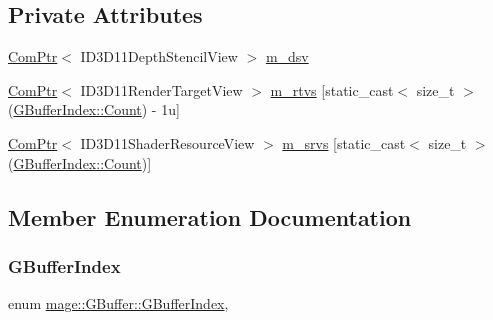 \subsection*{Private Attributes}
\begin{DoxyCompactItemize}
\item 
\hyperlink{namespacemage_ae74f374780900893caa5555d1031fd79}{Com\+Ptr}$<$ I\+D3\+D11\+Depth\+Stencil\+View $>$ \hyperlink{structmage_1_1_g_buffer_a75ef598ba704be52788b7d6c9efe26e7}{m\+\_\+dsv}
\item 
\hyperlink{namespacemage_ae74f374780900893caa5555d1031fd79}{Com\+Ptr}$<$ I\+D3\+D11\+Render\+Target\+View $>$ \hyperlink{structmage_1_1_g_buffer_a323230c320cc2de8ec9e2fb7aea45e92}{m\+\_\+rtvs} \mbox{[}static\+\_\+cast$<$ size\+\_\+t $>$(\hyperlink{structmage_1_1_g_buffer_a72f0fc0f46052fdc9872c48c57894607ae93f994f01c537c4e2f7d8528c3eb5e9}{G\+Buffer\+Index\+::\+Count}) -\/ 1u\mbox{]}
\item 
\hyperlink{namespacemage_ae74f374780900893caa5555d1031fd79}{Com\+Ptr}$<$ I\+D3\+D11\+Shader\+Resource\+View $>$ \hyperlink{structmage_1_1_g_buffer_aec49b46758c36b8963a53e709a89bb0e}{m\+\_\+srvs} \mbox{[}static\+\_\+cast$<$ size\+\_\+t $>$(\hyperlink{structmage_1_1_g_buffer_a72f0fc0f46052fdc9872c48c57894607ae93f994f01c537c4e2f7d8528c3eb5e9}{G\+Buffer\+Index\+::\+Count})\mbox{]}
\end{DoxyCompactItemize}


\subsection{Member Enumeration Documentation}
\hypertarget{structmage_1_1_g_buffer_a72f0fc0f46052fdc9872c48c57894607}{}\label{structmage_1_1_g_buffer_a72f0fc0f46052fdc9872c48c57894607} 
\subsubsection{\texorpdfstring{G\+Buffer\+Index}{GBufferIndex}}
{\footnotesize\ttfamily enum \hyperlink{structmage_1_1_g_buffer_a72f0fc0f46052fdc9872c48c57894607}{mage\+::\+G\+Buffer\+::\+G\+Buffer\+Index}\hspace{0.3cm}{\ttfamily [strong]}, {\ttfamily [private]}}

